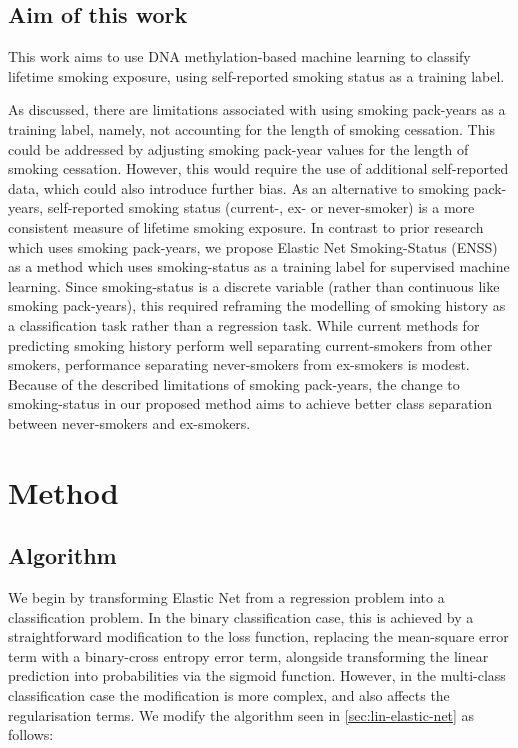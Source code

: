 \documentclass[draft]{article} %
\begin{document}
\subsection{Aim of this work}
This work aims to use DNA methylation-based machine learning to classify lifetime smoking exposure, using self-reported smoking status as a training label.

As discussed, there are limitations associated with using smoking pack-years as a training label, namely, not accounting for the length of smoking cessation. This could be addressed by adjusting smoking pack-year values for the length of smoking cessation. However, this would require the use of additional self-reported data, which could also introduce further bias. As an alternative to smoking pack-years, self-reported smoking status (current-, ex- or never-smoker) is a more consistent measure of lifetime smoking exposure. In contrast to prior research which uses smoking pack-years, we propose Elastic Net Smoking-Status (ENSS) as a method which uses smoking-status as a training label for supervised machine learning.  Since smoking-status is a discrete variable (rather than continuous like smoking pack-years), this required reframing the modelling of smoking history as a classification task rather than a regression task. While current methods for predicting smoking history perform well separating current-smokers from other smokers, performance separating never-smokers from ex-smokers is modest. Because of the described limitations of smoking pack-years, the change to smoking-status in our proposed method aims to achieve better class separation between never-smokers and ex-smokers.



\newpage
\section{Method}

\subsection{Algorithm} \label{sec:algorithm}
We begin by transforming Elastic Net from a regression problem into a classification problem. In the binary classification case, this is achieved by a straightforward modification to the loss function, replacing the mean-square error term with a binary-cross entropy error term, alongside transforming the linear prediction into probabilities via the sigmoid function. However, in the multi-class classification case the modification is more complex, and also affects the regularisation terms. We modify the algorithm seen in \ref{sec:lin-elastic-net} as follows:
\end{document}
